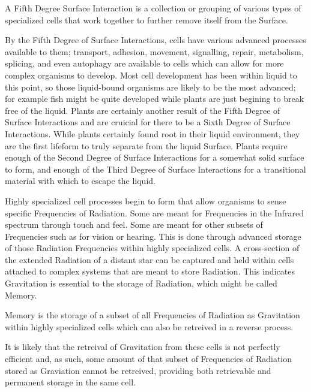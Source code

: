 \documentclass[12pt]{article}
\begin{document}
\begin{defn}
   A Fifth Degree Surface Interaction is a collection or grouping of various types of specialized cells that work together to further remove itself from the Surface.
\end{defn}


By the Fifth Degree of Surface Interactions, cells have various advanced processes available to them; transport, adhesion, movement, signalling, repair, metabolism, splicing, and even autophagy are available to cells which can allow for more complex organisms to develop. Most cell development has been within liquid to this point, so those liquid-bound organisms are likely to be the most advanced; for example fish might be quite developed while plants are just begining to break free of the liquid. Plants are certainly another result of the Fifth Degree of Surface Interactions and are cruicial for there to be a Sixth Degree of Surface Interactions. While plants certainly found root in their liquid environment, they are the first lifeform to truly separate from the liquid Surface. Plants require enough of the Second Degree of Surface Interactions for a somewhat solid surface to form, and enough of the Third Degree of Surface Interactions for a transitional material with which to escape the liquid.

Highly specialized cell processes begin to form that allow organisms to sense specific Frequencies of Radiation. Some are meant for Frequencies in the Infrared spectrum through touch and feel. Some are meant for other subsets of Frequencies such as for vision or hearing. This is done through advanced storage of those Radiation Frequencies within highly specialized cells. A cross-section of the extended Radiation of a distant star can be captured and held within cells attached to complex systems that are meant to store Radiation. This indicates Gravitation is essential to the storage of Radiation, which might be called Memory.

\begin{defn}
   Memory is the storage of a subset of all Frequencies of Radiation as Gravitation within highly specialized cells which can also be retreived in a reverse process. 
\end{defn}

It is likely that the retreival of Gravitation from these cells is not perfectly efficient and, as such, some amount of that subset of Frequencies of Radiation stored as Graviation cannot be retreived, providing both retrievable and permanent storage in the same cell.
\end{document}
